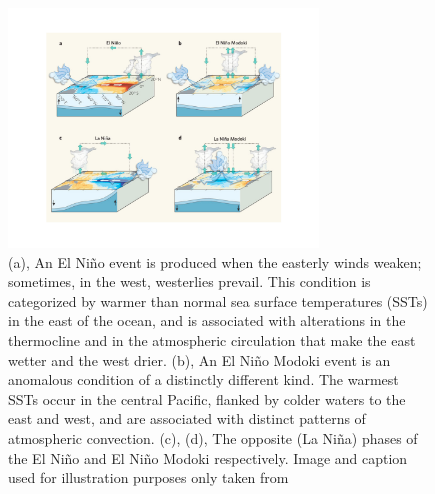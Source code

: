 \documentclass[]{article}
\begin{document}
\begin{figure}[htbp]
	\centering
		\includegraphics[height=2.5in]{figures/nino_cartoon.pdf}
	\caption{(a), An El Ni\~no event is produced when the easterly winds weaken; sometimes, in the west, westerlies prevail. This condition is categorized by warmer than normal sea surface temperatures (SSTs) in the east of the ocean, and is associated with alterations in the thermocline and in the atmospheric circulation that make the east wetter and the west drier. (b), An El Ni\~no Modoki event is an anomalous condition of a distinctly different kind. The warmest SSTs occur in the central Pacific, flanked by colder waters to the east and west, and are associated with distinct patterns of atmospheric convection. (c), (d), The opposite (La Ni\~na) phases of the El Niño and El Ni\~no Modoki respectively. Image and caption used for illustration purposes only taken from \cite{ashok2009}}
	\label{fig:enso_cartoon}
\end{figure}
\end{document}

